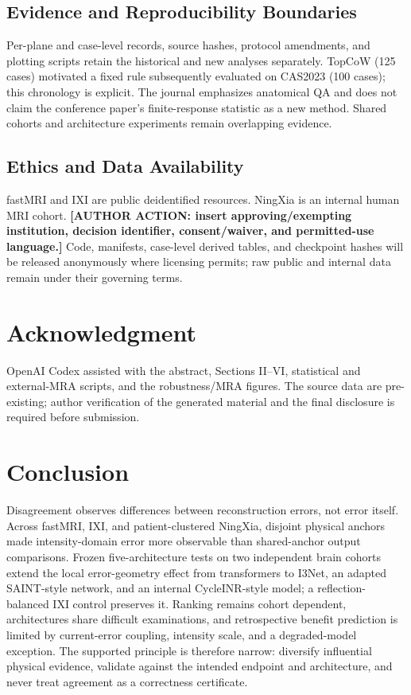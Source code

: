 \documentclass[journal,10pt]{IEEEtran}
\begin{document}
\subsection{Evidence and Reproducibility Boundaries}
Per-plane and case-level records, source hashes, protocol amendments, and plotting scripts retain the historical and new analyses separately. TopCoW (125 cases) motivated a fixed rule subsequently evaluated on CAS2023 (100 cases); this chronology is explicit. The journal emphasizes anatomical QA and does not claim the conference paper's finite-response statistic as a new method. Shared cohorts and architecture experiments remain overlapping evidence.

\subsection{Ethics and Data Availability}
fastMRI and IXI are public deidentified resources. NingXia is an internal human MRI cohort. \textbf{[AUTHOR ACTION: insert approving/exempting institution, decision identifier, consent/waiver, and permitted-use language.] } Code, manifests, case-level derived tables, and checkpoint hashes will be released anonymously where licensing permits; raw public and internal data remain under their governing terms.

\section*{Acknowledgment}
OpenAI Codex assisted with the abstract, Sections II--VI, statistical and external-MRA scripts, and the robustness/MRA figures. The source data are pre-existing; author verification of the generated material and the final disclosure is required before submission.

\section{Conclusion}
Disagreement observes differences between reconstruction errors, not error itself. Across fastMRI, IXI, and patient-clustered NingXia, disjoint physical anchors made intensity-domain error more observable than shared-anchor output comparisons. Frozen five-architecture tests on two independent brain cohorts extend the local error-geometry effect from transformers to I3Net, an adapted SAINT-style network, and an internal CycleINR-style model; a reflection-balanced IXI control preserves it. Ranking remains cohort dependent, architectures share difficult examinations, and retrospective benefit prediction is limited by current-error coupling, intensity scale, and a degraded-model exception. The supported principle is therefore narrow: diversify influential physical evidence, validate against the intended endpoint and architecture, and never treat agreement as a correctness certificate.



\end{document}
